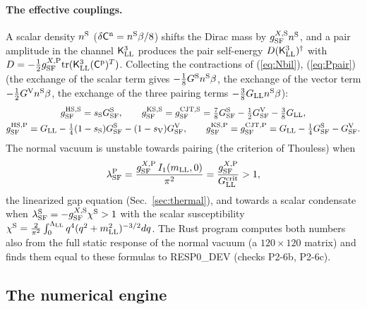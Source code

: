 \documentclass[aps,prd,onecolumn,superscriptaddress,nofootinbib,floatfix,longbibliography]{revtex4-2}
\newcommand{\LL}{{\rm LL}}
\newcommand{\SF}{{\rm SF}}
\newcommand{\tr}{\mathrm{tr}}
\begin{document}
\paragraph*{The effective couplings.}
A scalar density $n^{\rm S}$ ($\delta\mathsf C^{\rm n}=n^{\rm S}\beta/8$) shifts the Dirac mass by $g^{X,{\rm S}}_\SF n^{\rm S}$, and a pair amplitude in the
channel $\mathsf K^3_\LL$ produces the pair self-energy $D(\mathsf K^3_\LL)^\dagger$ with $D=-\frac12g^{X,{\rm P}}_\SF\tr(\mathsf K^3_\LL(\mathsf C^{\rm p})^T)$.
Collecting the contractions of (\ref{eq:Nbil}), (\ref{eq:Ppair}) (the exchange of the scalar term gives $-\frac18G^{\rm S}n^{\rm S}\beta$, the
exchange of the vector term $-\frac12G^{\rm V}n^{\rm S}\beta$, the exchange of the three pairing terms $-\frac38G_\LL n^{\rm S}\beta$):
\begin{gather}
g^{{\rm HS},{\rm S}}_\SF=s_{\rm S}G^{\rm S}_\SF,\qquad g^{{\rm KS},{\rm S}}_\SF=g^{{\rm CJT},{\rm S}}_\SF=\tfrac78G^{\rm S}_\SF-\tfrac12G^{\rm V}_\SF-\tfrac38G_\LL,\label{eq:gS}\\
g^{{\rm HS},{\rm P}}_\SF=G_\LL-\tfrac14(1-s_{\rm S})G^{\rm S}_\SF-(1-s_{\rm V})G^{\rm V}_\SF,\qquad g^{{\rm KS},{\rm P}}_\SF=g^{{\rm CJT},{\rm P}}_\SF=G_\LL-\tfrac14G^{\rm S}_\SF-G^{\rm V}_\SF.\label{eq:gP}
\end{gather}
The normal vacuum is unstable towards pairing (the criterion of Thouless) when
\begin{equation}
\lambda^{\rm P}_\SF=\frac{g^{X,{\rm P}}_\SF\,I_1(m_\LL,0)}{\pi^2}=\frac{g^{X,{\rm P}}_\SF}{G^{\rm crit}_\LL}>1,
\label{eq:lambda0}
\end{equation}
the linearized gap equation (Sec.~\ref{sec:thermal}), and towards a scalar condensate when $\lambda^{\rm S}_\SF=-g^{X,{\rm S}}_\SF\chi^{\rm S}>1$ with
the scalar susceptibility $\chi^{\rm S}=\frac2{\pi^2}\int_0^{\Lambda_\LL}q^4(q^2+m_\LL^2)^{-3/2}dq$. The Rust program computes both numbers also from
the full static response of the normal vacuum (a $120\times120$ matrix) and finds them equal to these formulas to {{RESP0_DEV}}
(checks P2-6b, P2-6c).

\subsection{The numerical engine}
\end{document}
